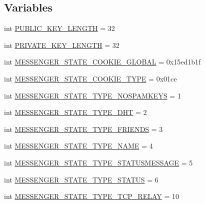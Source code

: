 \subsection*{Variables}
\begin{DoxyCompactItemize}
\item 
int \hyperlink{namespacemake-funny-savefile_a500205b593194be33d2408790aabc042}{P\+U\+B\+L\+I\+C\+\_\+\+K\+E\+Y\+\_\+\+L\+E\+N\+G\+T\+H} = 32
\item 
int \hyperlink{namespacemake-funny-savefile_a6796777fd2fe7d53d8d7991f2b408b32}{P\+R\+I\+V\+A\+T\+E\+\_\+\+K\+E\+Y\+\_\+\+L\+E\+N\+G\+T\+H} = 32
\item 
int \hyperlink{namespacemake-funny-savefile_ac50b778e4b71ad561339c51308682079}{M\+E\+S\+S\+E\+N\+G\+E\+R\+\_\+\+S\+T\+A\+T\+E\+\_\+\+C\+O\+O\+K\+I\+E\+\_\+\+G\+L\+O\+B\+A\+L} = 0x15ed1b1f
\item 
int \hyperlink{namespacemake-funny-savefile_a91668da1c0c20a16d017508e37b2b492}{M\+E\+S\+S\+E\+N\+G\+E\+R\+\_\+\+S\+T\+A\+T\+E\+\_\+\+C\+O\+O\+K\+I\+E\+\_\+\+T\+Y\+P\+E} = 0x01ce
\item 
int \hyperlink{namespacemake-funny-savefile_a02ba0b55f5671e55cb5251e044d3155b}{M\+E\+S\+S\+E\+N\+G\+E\+R\+\_\+\+S\+T\+A\+T\+E\+\_\+\+T\+Y\+P\+E\+\_\+\+N\+O\+S\+P\+A\+M\+K\+E\+Y\+S} = 1
\item 
int \hyperlink{namespacemake-funny-savefile_a29ea7dd46c0838a06ff966650cd1386f}{M\+E\+S\+S\+E\+N\+G\+E\+R\+\_\+\+S\+T\+A\+T\+E\+\_\+\+T\+Y\+P\+E\+\_\+\+D\+H\+T} = 2
\item 
int \hyperlink{namespacemake-funny-savefile_a4f5867003745913bc3e017b343ea6b1c}{M\+E\+S\+S\+E\+N\+G\+E\+R\+\_\+\+S\+T\+A\+T\+E\+\_\+\+T\+Y\+P\+E\+\_\+\+F\+R\+I\+E\+N\+D\+S} = 3
\item 
int \hyperlink{namespacemake-funny-savefile_acd6cf9288a12d3e1453e9763c6d73594}{M\+E\+S\+S\+E\+N\+G\+E\+R\+\_\+\+S\+T\+A\+T\+E\+\_\+\+T\+Y\+P\+E\+\_\+\+N\+A\+M\+E} = 4
\item 
int \hyperlink{namespacemake-funny-savefile_ac9983a5e9f6888e54509ccf864a048c8}{M\+E\+S\+S\+E\+N\+G\+E\+R\+\_\+\+S\+T\+A\+T\+E\+\_\+\+T\+Y\+P\+E\+\_\+\+S\+T\+A\+T\+U\+S\+M\+E\+S\+S\+A\+G\+E} = 5
\item 
int \hyperlink{namespacemake-funny-savefile_a1a1498184c7a7206401cd4542975cc17}{M\+E\+S\+S\+E\+N\+G\+E\+R\+\_\+\+S\+T\+A\+T\+E\+\_\+\+T\+Y\+P\+E\+\_\+\+S\+T\+A\+T\+U\+S} = 6
\item 
int \hyperlink{namespacemake-funny-savefile_a01bd5cc6ed5218a91723c2c1cca96a2d}{M\+E\+S\+S\+E\+N\+G\+E\+R\+\_\+\+S\+T\+A\+T\+E\+\_\+\+T\+Y\+P\+E\+\_\+\+T\+C\+P\+\_\+\+R\+E\+L\+A\+Y} = 10

\end{DoxyCompactItemize}
